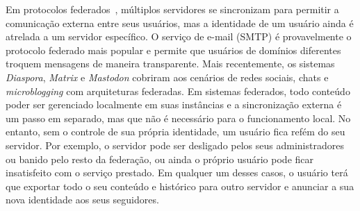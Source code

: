 \documentclass[12pt]{article}
\newcommand{\FC} {Freechains\xspace}
\begin{document}

Em protocolos federados~\cite{TODO}, múltiplos servidores se sincronizam para
permitir a comunicação externa entre seus usuários, mas a identidade de um
usuário ainda é atrelada a um servidor específico.
O serviço de e-mail (SMTP) é provavelmente o protocolo federado mais popular e
permite que usuários de domínios diferentes troquem mensagens de maneira
transparente.
Mais recentemente, os sistemas \emph{Diaspora}, \emph{Matrix} e \emph{Mastodon}
cobriram aos cenários de redes sociais, chats e \emph{microblogging} com
arquiteturas federadas.
Em sistemas federados, todo conteúdo poder ser gerenciado localmente em suas
instâncias e a sincronização externa é um passo em separado, mas que não é
necessário para o funcionamento local.
No entanto, sem o controle de sua própria identidade, um usuário fica refém do
seu servidor.
Por exemplo, o servidor pode ser desligado pelos seus administradores ou banido
pelo resto da federação, ou ainda o próprio usuário pode ficar insatisfeito com
o serviço prestado.
Em qualquer um desses casos, o usuário terá que exportar todo o seu conteúdo e
histórico para outro servidor e anunciar a sua nova identidade aos seus
seguidores.
\end{document}
